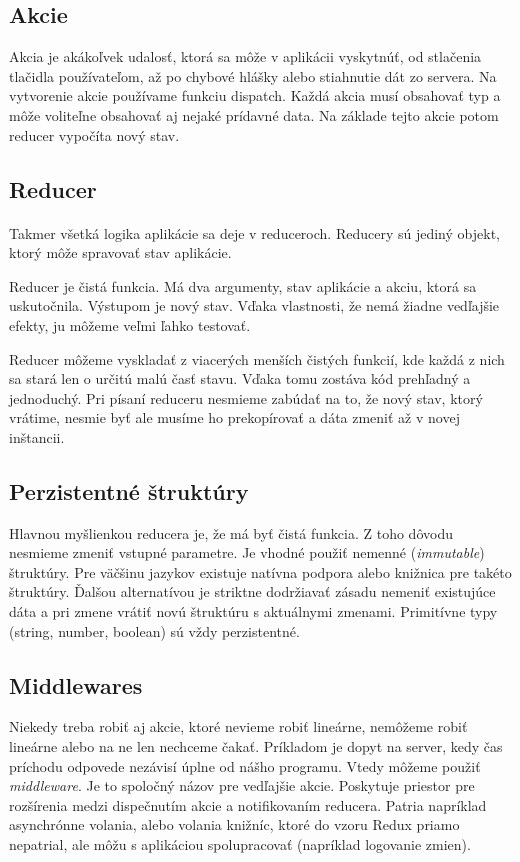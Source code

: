 \subsection{Akcie}
Akcia je akákoľvek udalosť, ktorá sa môže v aplikácii vyskytnúť, od stlačenia tlačidla používateľom, až po chybové hlášky alebo stiahnutie dát zo servera. Na vytvorenie akcie používame funkciu dispatch. Každá akcia musí obsahovať typ a môže voliteľne obsahovať aj nejaké prídavné data. Na základe tejto akcie potom reducer vypočíta nový stav.

\subsection{Reducer}
\emph{} \cite{reduxReducer}

\paragraph{}
Takmer všetká logika aplikácie sa deje v reduceroch. Reducery sú jediný objekt, ktorý môže spravovať stav aplikácie.

Reducer je čistá funkcia. Má dva argumenty, stav aplikácie a akciu, ktorá sa uskutočnila. Výstupom je nový stav. Vďaka vlastnosti, že nemá žiadne vedľajšie efekty, ju môžeme veľmi ľahko testovať.

Reducer môžeme vyskladať z viacerých menších čistých funkcií, kde každá z nich sa stará len o určitú malú časť stavu. Vďaka tomu zostáva kód prehľadný a jednoduchý. 
Pri písaní reduceru nesmieme zabúdať na to, že nový stav, ktorý vrátime, nesmie byť  ale musíme ho prekopírovať a dáta zmeniť až v novej inštancii.

\subsection{Perzistentné štruktúry}
Hlavnou myšlienkou reducera je, že má byť čistá funkcia. Z toho dôvodu nesmieme zmeniť vstupné parametre. Je vhodné použiť nemenné (\emph{immutable}) štruktúry. Pre väčšinu jazykov existuje natívna podpora alebo knižnica pre takéto štruktúry. Ďalšou alternatívou je striktne dodržiavať zásadu nemeniť existujúce dáta a pri zmene vrátiť novú štruktúru s aktuálnymi zmenami. Primitívne typy (string, number, boolean) sú vždy perzistentné.

\subsection{Middlewares}
\label{subsec:middlewares}
Niekedy treba robiť aj akcie, ktoré nevieme robiť lineárne, nemôžeme robiť lineárne alebo na ne len nechceme čakať. Príkladom je dopyt na server, kedy čas príchodu odpovede nezávisí úplne od nášho programu. Vtedy môžeme použiť \emph{middleware}. Je to spoločný názov pre vedľajšie akcie. Poskytuje priestor pre rozšírenia medzi dispečnutím akcie a notifikovaním reducera. Patria napríklad asynchrónne volania, alebo volania knižníc, ktoré do vzoru Redux priamo nepatrial, ale môžu s aplikáciou spolupracovať (napríklad logovanie zmien).

